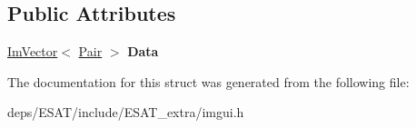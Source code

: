 \subsection*{Public Attributes}
\begin{DoxyCompactItemize}
\item 
\mbox{\label{struct_im_gui_storage_aab0b9789fac598a34c500459259fde42}} 
\mbox{\hyperlink{class_im_vector}{Im\+Vector}}$<$ \mbox{\hyperlink{struct_im_gui_storage_1_1_pair}{Pair}} $>$ {\bfseries Data}
\end{DoxyCompactItemize}


The documentation for this struct was generated from the following file\+:\begin{DoxyCompactItemize}
\item 
deps/\+E\+S\+A\+T/include/\+E\+S\+A\+T\+\_\+extra/imgui.\+h\end{DoxyCompactItemize}
